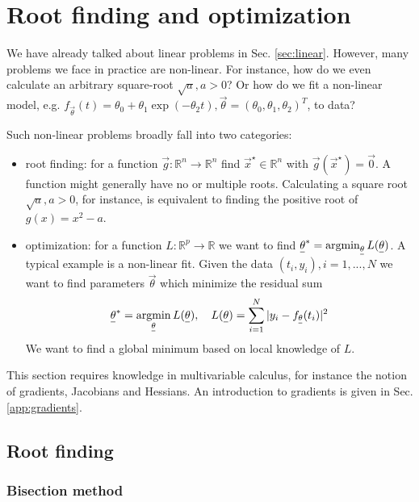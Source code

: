 \section{Root finding and optimization}
\thispagestyle{plain}

We have already talked about linear problems in Sec. \ref{sec:linear}. However,
many problems we face in practice are non-linear. For instance, how do we even
calculate an arbitrary square-root $\sqrt{a}, a>0$? Or how do we fit 
a non-linear model, e.g. 
$f_\vec{\theta}(t) = \theta_0 + \theta_1 \exp{(-\theta_2 t)}, \vec{\theta} = (\theta_0, \theta_1, \theta_2)^T$, to data?

Such non-linear problems broadly fall into two categories:

\begin{itemize}
    \item root finding: for a function $\vec{g}: \mathbb{R}^n \rightarrow \mathbb{R}^n$ find $\vec{x}^\star \in \mathbb{R}^n$ with $\vec{g}(\vec{x}^\star) = \vec{0}$. A function might generally have
    no or multiple roots. Calculating a square root $\sqrt{a}, a>0$, for instance, is equivalent to finding the positive root of
    $g(x) = x^2 - a$.
    \item optimization: for a function $L: \mathbb{R}^p \rightarrow \mathbb{R}$ we want to find $\vec{\theta}^* = \argmin_{\vec{\theta}} L(\vec{\theta})$.
    A typical example is a non-linear fit. Given the data $(t_i, y_i), i=1,...,N$ we want
    to find parameters $\vec{\theta}$ which minimize the residual sum
    \begin{equation}
        \vec{\theta}^* = \argmin_{\vec{\theta}} L(\vec{\theta}), \quad L(\vec{\theta}) = \sum_{i=1}^{N} |y_i - f_\vec{\theta}(t_i)|^2
    \end{equation}
    We want to find a global minimum based on local knowledge of $L$.
\end{itemize}

This section requires knowledge in multivariable calculus, for instance the notion of gradients, Jacobians and
Hessians. An introduction to gradients is given in Sec. \ref{app:gradients}.

\subsection{Root finding}

\subsubsection{Bisection method}

